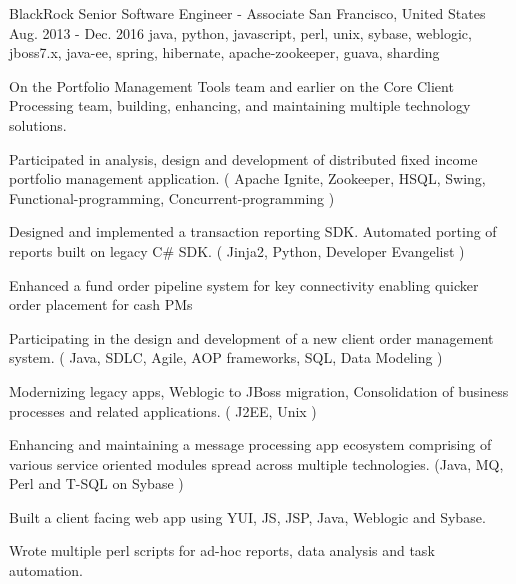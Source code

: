 \cventry
    {BlackRock} %
    {Senior Software Engineer - Associate} %
    {San Francisco, United States} %
    {Aug. 2013 - Dec. 2016} %
    {java, python, javascript, perl, unix, sybase, weblogic, jboss7.x, java-ee, spring, hibernate, apache-zookeeper, guava, sharding}%
    {
        On the Portfolio Management Tools team and earlier on the Core Client Processing team, building, enhancing, and maintaining multiple technology solutions.
    \begin{cvitems} %
        \item { Participated in analysis, design and development of distributed fixed income portfolio management application. ( Apache Ignite, Zookeeper, HSQL, Swing, Functional-programming, Concurrent-programming )}
        \item { Designed and implemented a transaction reporting SDK. Automated porting of reports built on legacy C\# SDK. ( Jinja2, Python, Developer Evangelist )}
        \item { Enhanced a fund order pipeline system for key connectivity enabling quicker order placement for cash PMs}
        \item { Participating in the design and development of a new client order management system. ( Java, SDLC, Agile, AOP frameworks, SQL, Data Modeling )}
        \item { Modernizing legacy apps, Weblogic to JBoss migration, Consolidation of business processes and related applications. ( J2EE, Unix )}
        \item { Enhancing and maintaining a message processing app ecosystem comprising of various service oriented modules spread across multiple technologies. (Java, MQ, Perl and T-SQL on Sybase )}
        \item { Built a client facing web app using YUI, JS, JSP, Java, Weblogic and Sybase.}
        \item { Wrote multiple perl scripts for ad-hoc reports, data analysis and task automation.}
    \end{cvitems}
    }